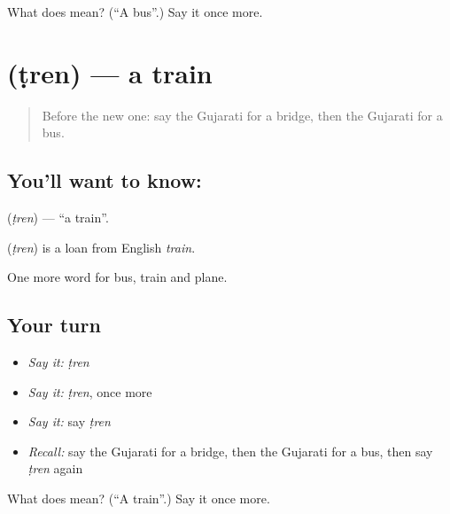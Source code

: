 \begin{tcolorbox}[breakable,colback=teal!4,colframe=teal!35!black,title={Before you move on}]
What does  mean? (\textquotedblleft{}A bus\textquotedblright{}.) Say it once more.
\end{tcolorbox}
\section[\texorpdfstring{\gu{ટ્રેન} (ṭren)}{ટ્રેન (ṭren)}]{ (ṭren) — a train}

\label{lesson:GU-C85-train}



\begin{quote}
Before the new one: say the Gujarati for a bridge, then the Gujarati for a bus.
\end{quote}

\subsection*{You'll want to know: }
\textbf{} (\emph{ṭren}) — \textquotedblleft{}a train\textquotedblright{}.

\begin{cousinweb}
\textbf{} (\emph{ṭren}) is a loan from English \emph{train}.
\end{cousinweb}

\begin{grammarlens}[title={What you've built}]
One more word for bus, train and plane.
\end{grammarlens}

\subsection*{Your turn}
\begin{itemize}
\raggedright
  \item \emph{Say it:} \emph{ṭren}
  \item \emph{Say it:} \emph{ṭren}, once more
  \item \emph{Say it:} say \emph{ṭren}
  \item \emph{Recall:} say the Gujarati for a bridge, then the Gujarati for a bus, then say \emph{ṭren} again
\end{itemize}

\begin{tcolorbox}[breakable,colback=teal!4,colframe=teal!35!black,title={Before you move on}]
What does  mean? (\textquotedblleft{}A train\textquotedblright{}.) Say it once more.
\end{tcolorbox}
